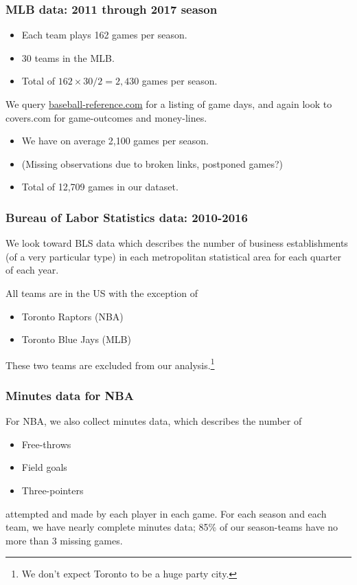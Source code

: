 \documentclass{beamer}
\begin{document}
\begin{frame}   \frametitle{MLB data: 2011 through 2017 season}
  \begin{itemize}     \item Each team plays 162 games per season.
    \item 30 teams in the MLB.
    \item Total of $162 \times 30 / 2 = 2,430$ games per season.   \end{itemize}
  
  \vspace{12pt}We query \href{http://www.baseball-reference.com/leagues/}{baseball-reference.com}
  for a listing of game days, and again look to covers.com for game-outcomes and money-lines.
  
  \vspace{12pt}
  \begin{itemize}     \item We have on average 2,100 games per season.
    \item (Missing observations due to broken links, postponed games?)
    \item Total of 12,709 games in our dataset.    \end{itemize} \end{frame}

\begin{frame}   \frametitle{Bureau of Labor Statistics data: 2010-2016}
  We look toward BLS data which describes the number of business establishments 
  (of a very particular type) in each metropolitan statistical area
  for each quarter of each year.
  
  \vspace{12pt}  All teams are in the US with the exception of 
  \vspace{12pt}\begin{itemize}     \item Toronto Raptors (NBA)
    \item Toronto Blue Jays (MLB)   \end{itemize} 

  \vspace{12pt}These two teams are excluded from our analysis.\footnote{We don't expect Toronto to be a huge party city.} \end{frame}

\begin{frame}   \frametitle{Minutes data for NBA}
  For NBA, we also collect minutes data, which describes the number of 
  \vspace{12pt}
  \begin{itemize}     
    \item Free-throws
    \item Field goals
    \item Three-pointers   
  \end{itemize}
  \vspace{12pt}attempted and made by each player in each game. For each season and each team,
  we have nearly complete minutes data; 85\% of our season-teams have no more than 3 missing games. \end{frame}
\end{document}
